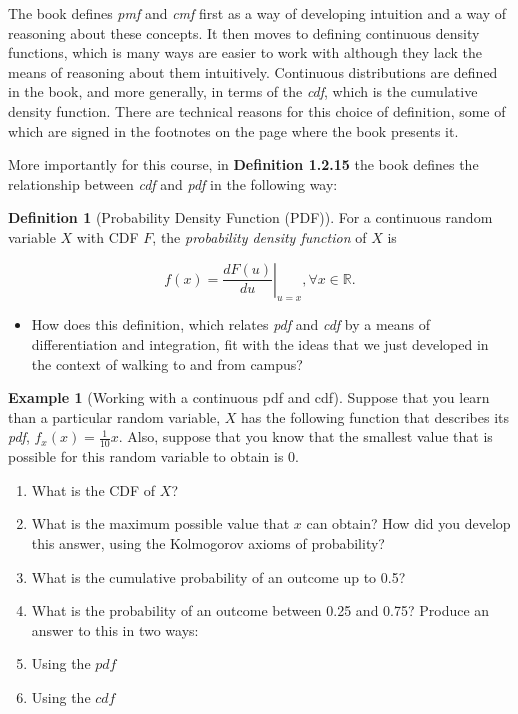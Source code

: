 \documentclass[
]{book}
\providecommand{\tightlist}{%
  \setlength{\itemsep}{0pt}\setlength{\parskip}{0pt}}
\theoremstyle{definition}
\newtheorem{definition}{Definition}[chapter]
\theoremstyle{definition}
\newtheorem{example}{Example}[chapter]
\theoremstyle{definition}
\theoremstyle{definition}
\theoremstyle{remark}
\begin{document}
The book defines \emph{pmf} and \emph{cmf} first as a way of developing intuition and a way of reasoning about these concepts. It then moves to defining continuous density functions, which is many ways are easier to work with although they lack the means of reasoning about them intuitively. Continuous distributions are defined in the book, and more generally, in terms of the \emph{cdf}, which is the cumulative density function. There are technical reasons for this choice of definition, some of which are signed in the footnotes on the page where the book presents it.

More importantly for this course, in \textbf{Definition 1.2.15} the book defines the relationship between \emph{cdf} and \emph{pdf} in the following way:

\begin{definition}[Probability Density Function (PDF)]
For a continuous random variable \(X\) with CDF \(F\), the \emph{probability density function} of \(X\) is

\[
  f(x) = \left. \frac{d F(u)}{du} \right|_{u=x}, \forall x \in \mathbb{R}.
\]
\end{definition}

\begin{itemize}
\tightlist
\item
  How does this definition, which relates \emph{pdf} and \emph{cdf} by a means of differentiation and integration, fit with the ideas that we just developed in the context of walking to and from campus?
\end{itemize}

\begin{example}[Working with a continuous pdf and cdf]

Suppose that you learn than a particular random variable, \(X\) has the following function that describes its \emph{pdf}, \(f_{x}(x) = \frac{1}{10}x\). Also, suppose that you know that the smallest value that is possible for this random variable to obtain is 0.

\begin{enumerate}
\def\labelenumi{\arabic{enumi}.}
\tightlist
\item
  What is the CDF of \(X\)?
\item
  What is the maximum possible value that \(x\) can obtain? How did you develop this answer, using the Kolmogorov axioms of probability?
\item
  What is the cumulative probability of an outcome up to 0.5?
\item
  What is the probability of an outcome between 0.25 and 0.75? Produce an answer to this in two ways:
\item
  Using the \(pdf\)
\item
  Using the \(cdf\)
\end{enumerate}

\end{example}
\end{document}

